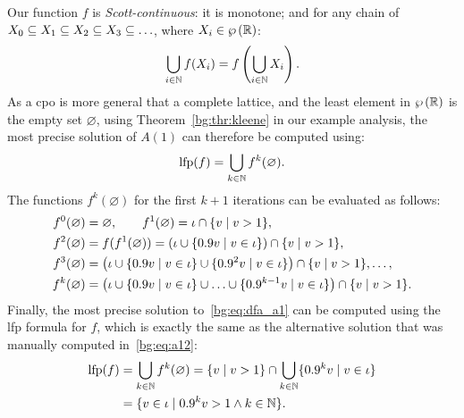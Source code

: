 Our function $f$ is \emph{Scott-continuous}: it is monotone; and for any chain
of $X_0 \subseteq X_1 \subseteq X_2 \subseteq X_3 \subseteq \mathellipsis$,
where $X_i \in \wp\left({\mathbb{R}}\right)$:
\begin{equation}
    \bigcup_{i \in \mathbb{N}} f(X_i) = f \left(
        \bigcup_{i \in \mathbb{N}} X_i
    \right).
\end{equation}
As a \gls{cpo} is more general that a complete lattice, and the least
element in $\wp\left({\mathbb{R}}\right)$ is the empty set $\varnothing$, using
Theorem~\ref{bg:thr:kleene} in our example analysis, the most precise solution
of $A(1)$ can therefore be computed using:
\begin{equation}
    \operatorname{\mathrm{lfp}} (f) = \bigcup_{k \in \mathbb{N}} f^k (\varnothing).
\end{equation}
The functions $f^k(\varnothing)$ for the first $k+1$ iterations can be
evaluated as follows:
\begin{equation}
    \begin{aligned}
        f^0(\varnothing) &= \varnothing, \quad\quad
        f^1(\varnothing) = \iota \cap \{ v \mid v > 1 \}, \\
        f^2(\varnothing) &= f(f^1(\varnothing))
               = \left(
                     \iota \cup
                     \{ 0.9v \mid v \in \iota \}
                 \right) \cap \{ v \mid v > 1 \}, \\
        f^3(\varnothing) &= \left(
                     \iota \cup
                     \{ 0.9v \mid v \in \iota \} \cup
                     \{ 0.9^2 v \mid v \in \iota \}
                 \right) \cap \{ v \mid v > 1 \}, \mathellipsis, \\
        f^k(\varnothing) &= \left(
                     \iota \cup
                     \{ 0.9v \mid v \in \iota \} \cup
                     \mathellipsis \cup
                     \{ 0.9^{k-1} v \mid v \in \iota \}
                 \right) \cap \{ v \mid v > 1 \}.
    \end{aligned}
\end{equation}
Finally, the most precise solution to~\eqref{bg:eq:dfa_a1} can be computed
using the \gls{lfp} formula for $f$, which is exactly the same as the
alternative solution that was manually computed in~\eqref{bg:eq:a12}:
\begin{equation}
    \begin{aligned}
        \operatorname{\mathrm{lfp}} (f)
            &= \bigcup_{k \in \mathbb{N}} f^k (\varnothing)
             = \{ v \mid v > 1 \} \cap
               \bigcup_{k \in \mathbb{N}} \{ 0.9^k v \mid v \in \iota \} \\
            &= \{ v \in \iota \mid 0.9^k v > 1 \wedge k \in \mathbb{N} \}.
    \end{aligned}
\end{equation}

